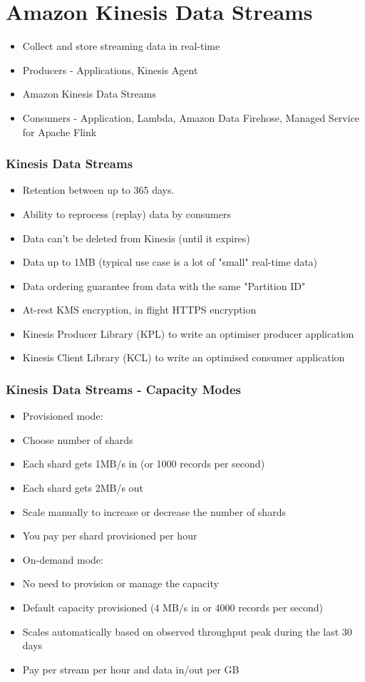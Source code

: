 \section{Amazon Kinesis Data Streams}
\begin{itemize}
    \item Collect and store streaming data in real-time
    \item Producers - Applications, Kinesis Agent
    \item Amazon Kinesis Data Streams
    \item Consumers - Application, Lambda, Amazon Data Firehose, Managed Service for Apache Flink
\end{itemize}

\subsubsection{Kinesis Data Streams}
\begin{itemize}
    \item Retention between up to 365 days.
    \item Ability to reprocess (replay) data by consumers
    \item Data can't be deleted from Kinesis (until it expires)
    \item Data up to 1MB (typical use case is a lot of "small" real-time data)
    \item Data ordering guarantee from data with the same "Partition ID"
    \item At-rest KMS encryption, in flight HTTPS encryption
    \item Kinesis Producer Library (KPL) to write an optimiser producer application
    \item Kinesis Client Library (KCL) to write an optimised consumer application
\end{itemize}

\subsubsection{Kinesis Data Streams - Capacity Modes}
\begin{itemize}
    \item Provisioned mode:
    \item Choose number of shards
    \item Each shard gets 1MB/s in (or 1000 records per second)
    \item Each shard gets 2MB/s out
    \item Scale manually to increase or decrease the number of shards
    \item You pay per shard provisioned per hour
    \item On-demand mode:
    \item No need to provision or manage the capacity
    \item Default capacity provisioned (4 MB/s in or 4000 records per second)
    \item Scales automatically based on observed throughput peak during the last 30 days
    \item Pay per stream per hour and data in/out per GB
\end{itemize}


